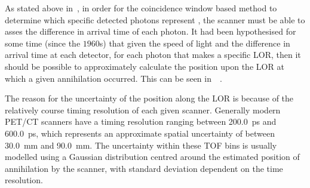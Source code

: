                 As stated above in~, in order for the coincidence window based method to determine which specific detected photons represent , the scanner must be able to asses the difference in arrival time of each photon. %
                It had been hypothesised for some time (since the $1960$s) that given the speed of light and the difference in arrival time at each detector, for each photon that makes a specific \gls{LOR}, then it should be possible to approximately calculate the position upon the \gls{LOR} at which a given annihilation occurred. %
                This can be seen in~~\parencite{Surti2015, TOFPhotodetectorsBib}.
                
                The reason for the uncertainty of the position along the \gls{LOR} is because of the relatively course timing resolution of each given scanner. Generally modern \gls{PET}/\gls{CT} scanners have a timing resolution ranging between \SI{200.0}{\pico\second} and \SI{600.0}{\pico\second}, which represents an approximate spatial uncertainty of between \SI{30.0}{\milli\metre} and \SI{90.0}{\milli\metre}. %
                The uncertainty within these \gls{TOF} bins is usually modelled using a Gaussian distribution centred around the estimated position of annihilation by the scanner, with standard deviation dependent on the time resolution.
                
                

